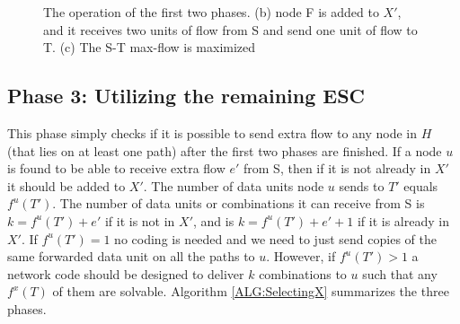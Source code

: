 \documentclass[conference]{IEEEtran}
\begin{document}
\begin{figure}[htp]
\begin{center}
\end{center}
\caption{The operation of the first two phases. (b) node F is added to $X'$, and it receives two units of flow from S and send one unit of flow to T. (c) The S-T max-flow is maximized}
\label{fig:phase2_ex}
\end{figure}

\subsection{Phase 3: Utilizing the remaining ESC}

This phase simply checks if it is possible to send extra flow to any node in $H$ (that lies on at least one path) after the first two phases are finished. If a node $u$ is found to be able to receive extra flow $e'$ from S, then if it is not already in $X'$ it should be added to $X'$. The number of data units node $u$ sends to $T'$ equals $f^u(T')$. The number of data units or combinations it can receive from S is $k = f^u(T') + e'$ if it is not in $X'$, and is $k = f^u(T') + e' + 1$ if it is already in $X'$. If $f^u(T') = 1$ no coding is needed and we need to just send copies of the same forwarded data unit on all the paths to $u$. However, if $f^u(T') > 1$ a network code should be designed to deliver $k$ combinations to $u$ such that any $f^x(T)$ of them are solvable. Algorithm \ref{ALG:SelectingX} summarizes the three phases. 
\end{document}
